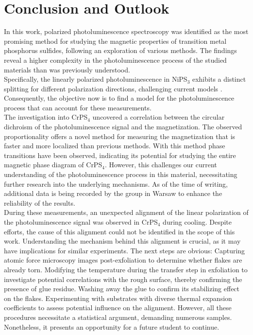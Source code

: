 \documentclass[
	twoside,
	parskip=half,
	a4paper,
]{scrbook}
\begin{document}
\chapter{Conclusion and Outlook}
In this work, polarized photoluminescence spectroscopy was identified as the most promising method for studying the magnetic properties of transition metal phosphorus sulfides, following an exploration of various methods.
The findings reveal a higher complexity in the photoluminescence process of the studied materials than was previously understood.\\
Specifically, the linearly polarized photoluminescence in NiPS$_3$ exhibits a distinct splitting for different polarization directions, challenging current models \cite{NiPS3_magnon_gap,NiPS3_linear,NiPS3_coherent}.
Consequently, the objective now is to find a model for the photoluminescence process that can account for these measurements.\\
The investigation into CrPS$_4$ uncovered a correlation between the circular dichroism of the photoluminescence signal and the magnetization.
The observed proportionality offers a novel method for measuring the magnetization that is faster and more localized than previous methods.
With this method phase transitions have been observed, indicating its potential for studying the entire magnetic phase diagram of CrPS$_4$.
However, this challenges our current understanding of the photoluminescence process in this material, necessitating further research into the underlying mechanisms.
As of the time of writing, additional data is being recorded by the group in Warsaw to enhance the reliability of the results.\\
During these measurements, an unexpected alignment of the linear polarization of the photoluminescence signal was observed in CrPS$_4$ during cooling.
Despite efforts, the cause of this alignment could not be identified in the scope of this work.
Understanding the mechanism behind this alignment is crucial, as it may have implications for similar experiments.
The next steps are obvious:
Capturing atomic force microscopy images post-exfoliation to determine whether flakes are already torn.
Modifying the temperature during the transfer step in exfoliation to investigate potential correlations with the rough surface, thereby confirming the presence of glue residue.
Washing away the glue to confirm its stabilizing effect on the flakes.
Experimenting with substrates with diverse thermal expansion coefficients to assess potential influence on the alignment.
However, all these procedures necessitate a statistical argument, demanding numerous samples. 
Nonetheless, it presents an opportunity for a future student to continue.
\end{document}
